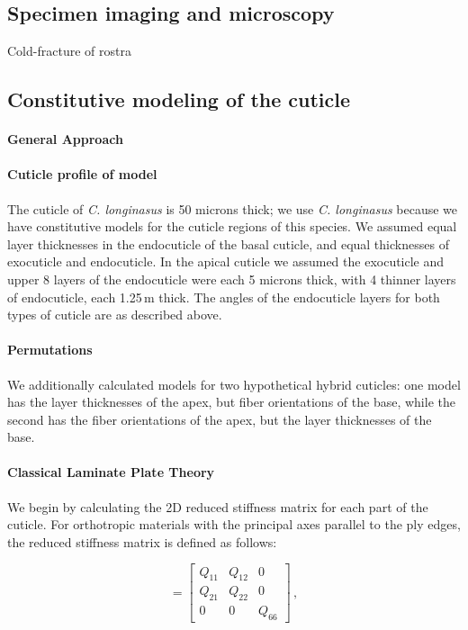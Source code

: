 \documentclass[twocolumn, linenumbers, superscriptaddress]{revtex4-1}
\begin{document}
		\subsection*{Specimen imaging and microscopy}
			Cold-fracture of rostra
		
		\subsection*{Constitutive modeling of the cuticle}
			\paragraph*{General Approach}
			\paragraph*{Cuticle profile of model}
				The cuticle of \textit{C. longinasus} is 50 microns thick; we use \textit{C. longinasus} because we have constitutive models for the cuticle regions of this species.
				We assumed equal layer thicknesses in the endocuticle of the basal cuticle, and equal thicknesses of exocuticle and endocuticle.
				In the apical cuticle we assumed the exocuticle and upper 8 layers of the endocuticle were each 5 microns thick, with 4 thinner layers of endocuticle, each 1.25\,{\textmu}m thick.
				The angles of the endocuticle layers for both types of cuticle are as described above.
			\paragraph*{Permutations}
				We additionally calculated models for two hypothetical hybrid cuticles: one model has the layer thicknesses of the apex, but fiber orientations of the base, while the second has the fiber orientations of the apex, but the layer thicknesses of the base.
			\paragraph*{Classical Laminate Plate Theory}
				We begin by calculating the 2D reduced stiffness matrix for each part of the cuticle.
				For orthotropic materials with the principal axes parallel to the ply edges, the reduced stiffness matrix is defined as follows:
				
				\begin{equation}
				[Q] =
					\begin{bmatrix}
						Q_{11} & Q_{12} & 0 \\
						Q_{21} & Q_{22} & 0 \\
						0 & 0 & Q_{66}
					\end{bmatrix}\,,
				\end{equation}
				
\end{document}
